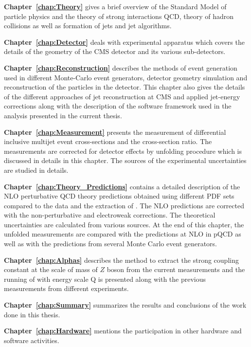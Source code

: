 {\bf Chapter~\ref{chap:Theory}} gives a brief overview of the Standard Model of particle physics and the theory of strong interactions QCD, theory of hadron collisions as well as formation of jets and jet algorithms. 

{\bf Chapter~\ref{chap:Detector}} deals with experimental apparatus which covers the details of the geometry of the CMS detector and its various sub-detectors.

{\bf Chapter~\ref{chap:Reconstruction}} describes the methods of event generation used in different Monte-Carlo event generators, detector geometry simulation and reconstruction of the particles in the detector. This chapter also gives the details of the different approaches of jet reconstruction at CMS and applied jet-energy corrections along with the description of the software framework used in the analysis presented in the current thesis.

{\bf Chapter~\ref{chap:Measurement}} presents the measurement of differential inclusive multijet event cross-sections and the cross-section ratio. The measurements are corrected for detector effects by unfolding procedure which is discussed in details in this chapter. The sources of the experimental uncertainties are studied in details. 

{\bf Chapter~\ref{chap:Theory_Predictions}} contains a detailed description of the NLO perturbative QCD theory predictions obtained using different PDF sets compared to the data and the extraction of \alps. The NLO predictions are corrected with the non-perturbative and electroweak corrections. The theoretical uncertainties are calculated from various sources. At the end of this chapter, the unfolded measurements are compared with the predictions at NLO in pQCD as well as with the predictions from several Monte Carlo event generators.

{\bf Chapter~\ref{chap:Alphas}} describes the method to extract the strong coupling constant at the scale of mass of $Z$ boson \alpsmz from the current measurements and the running of \alps with energy scale Q is presented along with the previous measurements from different experiments.

{\bf Chapter~\ref{chap:Summary}} summarizes the results and conclusions of the work done in this thesis.

{\bf Chapter~\ref{chap:Hardware}} mentions the participation in other hardware and software activities.
